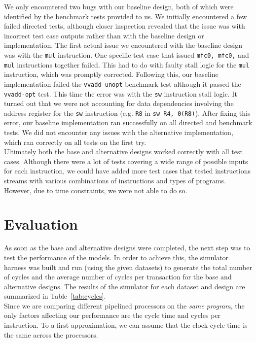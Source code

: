 \documentclass[10pt]{article}
\begin{document}
We only encountered two bugs with our baseline design, both of which were identified by the benchmark tests provided to us. We initially encountered a few failed directed tests, although closer inspection revealed that the issue was with incorrect test case outputs rather than with the baseline design or implementation. The first actual issue we encountered with the baseline design was with the \texttt{mul} instruction. One specific test case that issued \texttt{mfc0, mfc0,} and \texttt{mul} instructions together failed. This had to do with faulty stall logic for the \texttt{mul} instruction, which was promptly corrected. Following this, our baseline implementation failed the \texttt{vvadd-unopt} benchmark test although it passed the \texttt{vvadd-opt} test. This time the error was with the \texttt{sw} instruction stall logic. It turned out that we were not accounting for data dependencies involving the address register for the \texttt{sw} instruction (e.g. \texttt{R8} in \texttt{sw R4, 0(R8)}). After fixing this error, our baseline implementation ran successfully on all directed and benchmark tests. We did not encounter any issues with the alternative implementation, which ran correctly on all tests on the first try. \\ 

Ultimately both the base and alternative designs worked correctly with all test cases. Although there were a lot of tests covering a wide range of possible inputs for each instruction, we could have added more test cases that tested instructions streams with various combinations of instructions and types of programs. However, due to time constraints, we were not able to do so. \\


\section{Evaluation}

As soon as the base and alternative designs were completed, the next step was to test the performance of the models. In order to achieve this, the simulator harness was built and run (using the given datasets) to generate the total number of cycles and the average number of cycles per transaction for the base and alternative designs. The results of the simulator for each dataset and design are summarized in Table~\ref{tab:cycles}. \\

Since we are comparing different pipelined processors on the \textit{same program}, the only factors affecting our performance are the cycle time and cycles per instruction.
To a first approximation, we can assume that the clock cycle time is the same across the processors. \\
\end{document}
